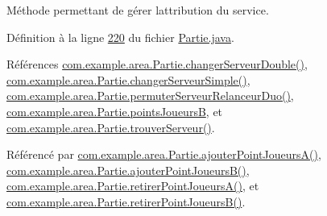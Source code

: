 Méthode permettant de gérer l\textquotesingle{}attribution du service. 



Définition à la ligne \hyperlink{_partie_8java_source_l00220}{220} du fichier \hyperlink{_partie_8java_source}{Partie.\+java}.



Références \hyperlink{_partie_8java_source_l00253}{com.\+example.\+area.\+Partie.\+changer\+Serveur\+Double()}, \hyperlink{_partie_8java_source_l00276}{com.\+example.\+area.\+Partie.\+changer\+Serveur\+Simple()}, \hyperlink{_partie_8java_source_l00293}{com.\+example.\+area.\+Partie.\+permuter\+Serveur\+Relanceur\+Duo()}, \hyperlink{_partie_8java_source_l00040}{com.\+example.\+area.\+Partie.\+points\+JoueursB}, et \hyperlink{_partie_8java_source_l00315}{com.\+example.\+area.\+Partie.\+trouver\+Serveur()}.



Référencé par \hyperlink{_partie_8java_source_l00128}{com.\+example.\+area.\+Partie.\+ajouter\+Point\+Joueurs\+A()}, \hyperlink{_partie_8java_source_l00147}{com.\+example.\+area.\+Partie.\+ajouter\+Point\+Joueurs\+B()}, \hyperlink{_partie_8java_source_l00166}{com.\+example.\+area.\+Partie.\+retirer\+Point\+Joueurs\+A()}, et \hyperlink{_partie_8java_source_l00179}{com.\+example.\+area.\+Partie.\+retirer\+Point\+Joueurs\+B()}.


